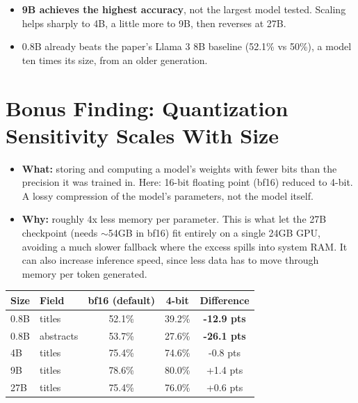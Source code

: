 \documentclass[12pt]{article}
\begin{document}
\begin{itemize}
    \item \textbf{9B achieves the highest accuracy}, not the largest model tested. Scaling helps sharply to 4B, a little more to 9B, then reverses at 27B.
    \item 0.8B already beats the paper's Llama 3 8B baseline (52.1\% vs 50\%), a model ten times its size, from an older generation.
\end{itemize}

\FloatBarrier
\section{Bonus Finding: Quantization Sensitivity Scales With Size}

\begin{itemize}
    \item \textbf{What:} storing and computing a model's weights with fewer bits than the precision it was trained in. Here: 16-bit floating point (bf16) reduced to 4-bit. A lossy compression of the model's parameters, not the model itself.
    \item \textbf{Why:} roughly 4x less memory per parameter. This is what let the 27B checkpoint (needs $\sim$54GB in bf16) fit entirely on a single 24GB GPU, avoiding a much slower fallback where the excess spills into system RAM. It can also increase inference speed, since less data has to move through memory per token generated.
\end{itemize}

\begin{table}[h]
\centering
\begin{tabular}{llccc}
\toprule
Size & Field & bf16 (default) & 4-bit & Difference \\
\midrule
0.8B & titles & 52.1\% & 39.2\% & \textbf{-12.9 pts} \\
0.8B & abstracts & 53.7\% & 27.6\% & \textbf{-26.1 pts} \\
4B & titles & 75.4\% & 74.6\% & -0.8 pts \\
9B & titles & 78.6\% & 80.0\% & +1.4 pts \\
27B & titles & 75.4\% & 76.0\% & +0.6 pts \\
\bottomrule
\end{tabular}
\end{table}
\end{document}
